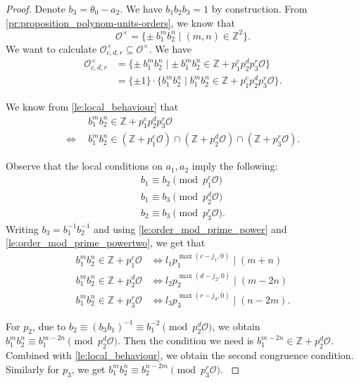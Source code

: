 \documentclass[11pt,letterpaper]{amsart}
\theoremstyle{definition}
\theoremstyle{remark}
\newcommand{\cal}[1]{\mathcal{#1}}
\newcommand{\bb}[1]{\mathbb{#1}}
\newcommand{\Z}{\bb Z}
\newcommand{\calO}{\cal O}
\begin{document}
	\begin{proof}
		Denote $b_3 = \theta_0 - a_2$. We have $b_1b_2b_3 = 1$ by construction.  
		From \cref{pr:proposition_polynom-units-orders}, we know that $$\calO^\times = \{\pm~b_1^m b_2^n \mid (m,n) \in \Z^2\}.$$ 
		We want to calculate $\calO_{c,d,r}^{\times}\subseteq\calO^{\times}$. We have
\begin{align}
		\calO_{c,d,r}^{\times} 
		 & = \{\pm~b_1^m b_2^n \mid \pm ~b_1^m b_2^n \in \Z + p_1^c p_2^d p_3^r \calO \} \\
		 & = \{\pm 1\} \cdot \{b_1^m b_2^n \mid b_1^m b_2^n \in \Z + p_1^c p_2^d p_3^r \calO \}.
		\end{align}
		
		We know from \cref{le:local_behaviour}
		that 
		\begin{align}
			& \ \ b_1^{m}b_2^{n}\in \Z + p_1^{c}p_2^{d}p_3^r\calO\\
			\Leftrightarrow 
			& \ \ b_1^{m}b_2^{n}\in 
			( \Z + p_1^{c}\calO
			)\cap( \Z + p_2^{d}\calO
			)\cap( \Z + p_3^r\calO
			)	.
		\end{align}
		
		Observe that the local conditions on $a_1,a_2$ imply the following:
		\begin{align}
			b_1\equiv b_2 \pmod{p_1^{c}\calO}\\
			b_1\equiv b_3 \pmod{p_2^{d}\calO}\\
			b_2\equiv b_3 \pmod{p_3^{r}\calO}.
		\end{align}
		Writing $b_3=b_1^{-1}b_2^{-1}$ and using \cref{le:order_mod_prime_power} and \cref{le:order_mod_prime_powertwo}, we get that 
		\begin{align}
			b_1^{m}b_2^{n} \in \Z + p_1^{c}\calO &\Leftrightarrow l_1 p_1^{\max( c-j_1,0 )} \mid (m+n)\\
			b_1^{m}b_2^{n} \in \Z + p_2^{d}\calO &\Leftrightarrow 
			l_2 p_2^{\max( d-j_2,0 )} \mid (m-2n)\\
			b_1^{m}b_2^{n} \in \Z + p_3^{r}\calO &\Leftrightarrow 
			l_3 p_3^{\max( r-j_3,0 )} \mid (n-2m).
		\end{align}
		
		{For $p_2$, due to $b_2\equiv(b_3b_1)^{-1}\equiv b_1^{-2}\pmod{ p_2^d\calO}$, we obtain $b_1^mb_2^n\equiv b_1^{m-2n}\pmod{p_2^d\calO}$. Then the condition we need is $b_1^{m-2n}\in \Z+p_2^d\calO $. Combined with \cref{le:local_behaviour}, we obtain the second congruence condition.
			Similarly for $p_3$, we get $b_1^{m}b_{2}^{n} \equiv b_{2}^{n-2m} \pmod{p_3^r\calO}$.
		}
	\end{proof}
	
\end{document}
